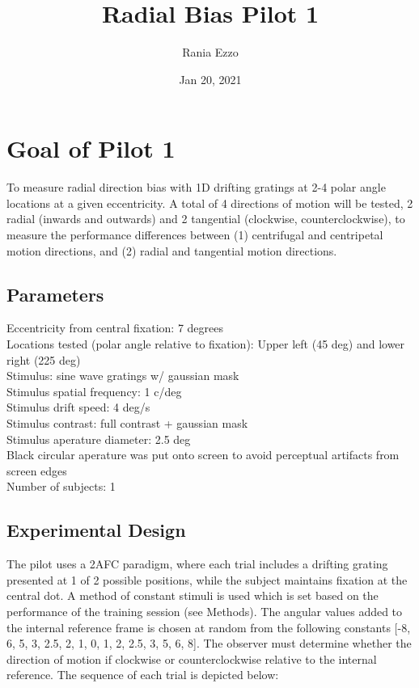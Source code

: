 \documentclass[11pt]{article} %
\title{Radial Bias Pilot 1}
\date{Jan 20, 2021}
\author{Rania Ezzo}
\begin{document}
\maketitle
\tableofcontents


\section{Goal of Pilot 1}
To measure radial direction bias with 1D drifting gratings at 2-4 polar angle locations at a given eccentricity. A total of 4 directions of motion will be tested, 2 radial (inwards and outwards) and 2 tangential (clockwise, counterclockwise), to measure the performance differences between (1) centrifugal and centripetal motion directions, and (2) radial and tangential motion directions. 

\subsection{Parameters}
Eccentricity from central fixation: 7 degrees
\\
Locations tested (polar angle relative to fixation): Upper left (45 deg) and lower right (225 deg)
\\
Stimulus: sine wave gratings w/ gaussian mask
\\
Stimulus spatial frequency: 1 c/deg
\\
Stimulus drift speed: 4 deg/s
\\
Stimulus contrast: full contrast + gaussian mask
\\
Stimulus aperature diameter: 2.5 deg
\\
Black circular aperature was put onto screen to avoid perceptual artifacts from screen edges
\\
Number of subjects: 1

\subsection{Experimental Design}
The pilot uses a 2AFC paradigm, where each trial includes a drifting grating presented at 1 of 2 possible positions, while the subject maintains fixation at the central dot. A method of constant stimuli is used which is set based on the performance of the training session (see Methods). The angular values added to the internal reference frame is chosen at random from the following constants [-8, 6, 5, 3, 2.5, 2, 1, 0, 1, 2, 2.5, 3, 5, 6, 8]. The observer must determine whether the direction of motion if clockwise or counterclockwise relative to the internal reference. The sequence of each trial is depicted below:
\end{document}
